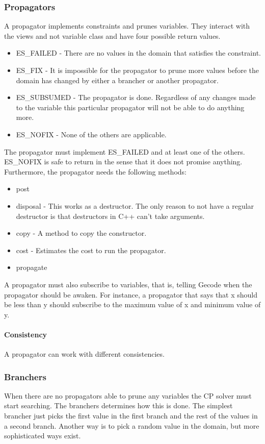 \documentclass[a4paper,11pt]{article}
\begin{document}
\subsubsection{Propagators}
A propagator implements constraints and prunes variables. They interact with the views and not variable class and have four possible return values.
\begin{itemize}
\item{ES\_FAILED} - There are no values in the domain that satisfies the constraint.
\item{ES\_FIX} - It is impossible for the propagator to prune more values before the domain has changed by either a brancher or another propagator.
\item{ES\_SUBSUMED} - The propagator is done. Regardless of any changes made to the variable this particular propagator will not be able to do anything more.
\item{ES\_NOFIX} - None of the others are applicable.
\end{itemize}
The propagator must implement ES\_FAILED and at least one of the others. ES\_NOFIX is safe to return in the sense that it does not promise anything. Furthermore, the propagator needs the following methods:
\begin{itemize}
\item{post}
\item{disposal} - This works as a destructor. The only reason to not have a regular destructor is that destructors in C++ can't take arguments.
\item{copy} - A method to copy the constructor.
\item{cost} - Estimates the cost to run the propagator.
\item{propagate}
\end{itemize}
A propagator must also subscribe to variables, that is, telling Gecode when the propagator should be awaken. For instance, a propagator that says that x should be less than y should subscribe to the maximum value of x and minimum value of y.

\paragraph{Consistency}
A propagator can work with different consistencies. 
\subsubsection{Branchers}
When there are no propagators able to prune any variables the CP solver must start searching. The branchers determines how this is done. The simplest brancher just picks the first value in the first branch and the rest of the values in a second branch. Another way is to pick a random value in the domain, but more sophisticated ways exist.
\end{document}
